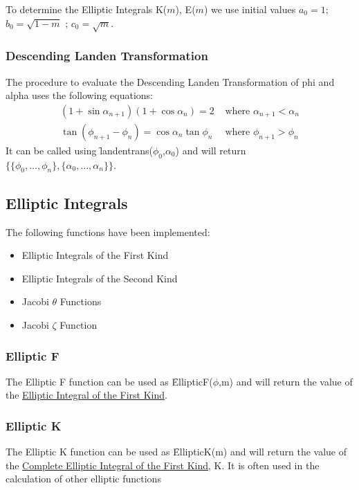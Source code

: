 To determine the Elliptic Integrals K($m$), E($m$) we use initial values
\(a_0 = 1\); \(b_0 = \sqrt{1-m}\) ; \(c_0 = \sqrt{m}\).


\subsubsection{Descending Landen Transformation}

The procedure to evaluate the Descending Landen Transformation of 
phi and alpha uses the following equations:
\begin{align*}
 (1+\sin \alpha_{n+1})(1+\cos \alpha_n)=2 &\text{ where } \alpha_{n+1}<\alpha_n \\
  \tan(\phi_{n+1}-\phi_n)=\cos \alpha_n \tan \phi_n & \text{ where } \phi_{n+1}>\phi_n
\end{align*}
It can be called using \f{landentrans}($\phi_0$,$\alpha_0$)
and will return \\
$\{\{\phi_0, \ldots ,\phi_n\},\{\alpha_0, \ldots ,\alpha_n\}\}$.

\subsection{Elliptic Integrals}
The following functions have been implemented:

\begin{itemize}
\item Elliptic Integrals of the First Kind
\item Elliptic Integrals of the Second Kind
\item Jacobi $\theta$ Functions
\item Jacobi $\zeta$ Function
\end{itemize}

\subsubsection{Elliptic F}

The Elliptic F function can be used as \f{EllipticF($\phi$,m)} and 
will return the value of the {\underline {Elliptic Integral of the 
First Kind}}.

\subsubsection{Elliptic K}

The Elliptic K function can be used as \f{EllipticK(m)} and will 
return the value of the {\underline {Complete Elliptic Integral of the
First Kind}}, K. It is often used in the calculation of other elliptic
functions

